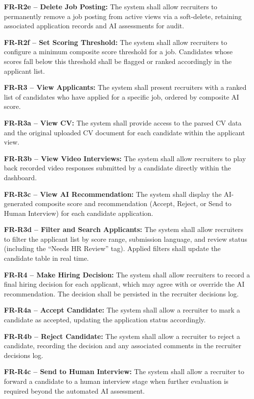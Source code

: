 \begin{outline}
    \3 \textbf{FR-R2e -- Delete Job Posting:}
    The system shall allow recruiters to permanently remove a job posting from active views
    via a soft-delete, retaining associated application records and AI assessments for audit.

    \3 \textbf{FR-R2f -- Set Scoring Threshold:}
    The system shall allow recruiters to configure a minimum composite score threshold for a
    job. Candidates whose scores fall below this threshold shall be flagged or ranked
    accordingly in the applicant list.

  \2 \textbf{FR-R3 -- View Applicants:}
  The system shall present recruiters with a ranked list of candidates who have applied for
  a specific job, ordered by composite AI score.

    \3 \textbf{FR-R3a -- View CV:}
    The system shall provide access to the parsed CV data and the original uploaded CV
    document for each candidate within the applicant view.

    \3 \textbf{FR-R3b -- View Video Interviews:}
    The system shall allow recruiters to play back recorded video responses submitted by a
    candidate directly within the dashboard.

    \3 \textbf{FR-R3c -- View AI Recommendation:}
    The system shall display the AI-generated composite score and recommendation (Accept,
    Reject, or Send to Human Interview) for each candidate application.

    \3 \textbf{FR-R3d -- Filter and Search Applicants:}
    The system shall allow recruiters to filter the applicant list by score range, submission
    language, and review status (including the ``Needs HR Review'' tag). Applied filters shall
    update the candidate table in real time.

  \2 \textbf{FR-R4 -- Make Hiring Decision:}
  The system shall allow recruiters to record a final hiring decision for each applicant,
  which may agree with or override the AI recommendation. The decision shall be persisted in
  the recruiter decisions log.

    \3 \textbf{FR-R4a -- Accept Candidate:}
    The system shall allow a recruiter to mark a candidate as accepted, updating the
    application status accordingly.

    \3 \textbf{FR-R4b -- Reject Candidate:}
    The system shall allow a recruiter to reject a candidate, recording the decision and any
    associated comments in the recruiter decisions log.

    \3 \textbf{FR-R4c -- Send to Human Interview:}
    The system shall allow a recruiter to forward a candidate to a human interview stage when
    further evaluation is required beyond the automated AI assessment.


\end{outline}
